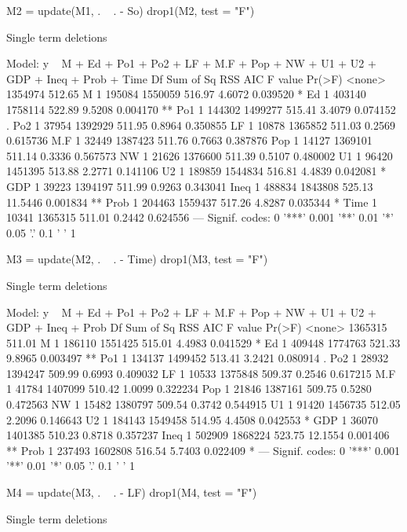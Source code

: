 \documentclass[a4paper]{article}\usepackage[]{graphicx}\usepackage[]{xcolor}
\begin{document}
\begin{Schunk}
\begin{Sinput}
M2 = update(M1, . ~ . - So)
drop1(M2, test = "F")
\end{Sinput}
\begin{Soutput}
Single term deletions

Model:
y ~ M + Ed + Po1 + Po2 + LF + M.F + Pop + NW + U1 + U2 + GDP + 
    Ineq + Prob + Time
       Df Sum of Sq     RSS    AIC F value   Pr(>F)   
<none>              1354974 512.65                    
M       1    195084 1550059 516.97  4.6072 0.039520 * 
Ed      1    403140 1758114 522.89  9.5208 0.004170 **
Po1     1    144302 1499277 515.41  3.4079 0.074152 . 
Po2     1     37954 1392929 511.95  0.8964 0.350855   
LF      1     10878 1365852 511.03  0.2569 0.615736   
M.F     1     32449 1387423 511.76  0.7663 0.387876   
Pop     1     14127 1369101 511.14  0.3336 0.567573   
NW      1     21626 1376600 511.39  0.5107 0.480002   
U1      1     96420 1451395 513.88  2.2771 0.141106   
U2      1    189859 1544834 516.81  4.4839 0.042081 * 
GDP     1     39223 1394197 511.99  0.9263 0.343041   
Ineq    1    488834 1843808 525.13 11.5446 0.001834 **
Prob    1    204463 1559437 517.26  4.8287 0.035344 * 
Time    1     10341 1365315 511.01  0.2442 0.624556   
---
Signif. codes:  0 '***' 0.001 '**' 0.01 '*' 0.05 '.' 0.1 ' ' 1
\end{Soutput}
\begin{Sinput}
M3 = update(M2, . ~ . - Time)
drop1(M3, test = "F")
\end{Sinput}
\begin{Soutput}
Single term deletions

Model:
y ~ M + Ed + Po1 + Po2 + LF + M.F + Pop + NW + U1 + U2 + GDP + 
    Ineq + Prob
       Df Sum of Sq     RSS    AIC F value   Pr(>F)   
<none>              1365315 511.01                    
M       1    186110 1551425 515.01  4.4983 0.041529 * 
Ed      1    409448 1774763 521.33  9.8965 0.003497 **
Po1     1    134137 1499452 513.41  3.2421 0.080914 . 
Po2     1     28932 1394247 509.99  0.6993 0.409032   
LF      1     10533 1375848 509.37  0.2546 0.617215   
M.F     1     41784 1407099 510.42  1.0099 0.322234   
Pop     1     21846 1387161 509.75  0.5280 0.472563   
NW      1     15482 1380797 509.54  0.3742 0.544915   
U1      1     91420 1456735 512.05  2.2096 0.146643   
U2      1    184143 1549458 514.95  4.4508 0.042553 * 
GDP     1     36070 1401385 510.23  0.8718 0.357237   
Ineq    1    502909 1868224 523.75 12.1554 0.001406 **
Prob    1    237493 1602808 516.54  5.7403 0.022409 * 
---
Signif. codes:  0 '***' 0.001 '**' 0.01 '*' 0.05 '.' 0.1 ' ' 1
\end{Soutput}
\begin{Sinput}
M4 = update(M3, . ~ . - LF)
drop1(M4, test = "F")
\end{Sinput}
\begin{Soutput}
Single term deletions


\end{Soutput}
\end{Schunk}
\end{document}
